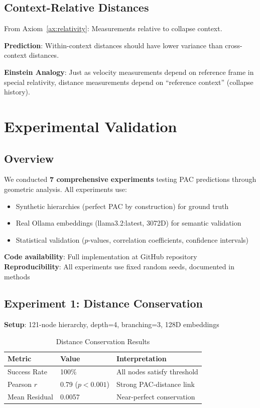 \documentclass[11pt,a4paper]{article}
\begin{document}
\subsection{Context-Relative Distances}

From Axiom~\ref{ax:relativity}: Measurements relative to collapse context.

\textbf{Prediction}: Within-context distances should have lower variance than cross-context distances.

\textbf{Einstein Analogy}: Just as velocity measurements depend on reference frame in special relativity, distance measurements depend on ``reference context'' (collapse history).

\section{Experimental Validation}

\subsection{Overview}

We conducted \textbf{7 comprehensive experiments} testing PAC predictions through geometric analysis. All experiments use:
\begin{itemize}
    \item Synthetic hierarchies (perfect PAC by construction) for ground truth
    \item Real Ollama embeddings (llama3.2:latest, 3072D) for semantic validation
    \item Statistical validation ($p$-values, correlation coefficients, confidence intervals)
\end{itemize}

\textbf{Code availability}: Full implementation at GitHub repository\\
\textbf{Reproducibility}: All experiments use fixed random seeds, documented in methods

\subsection{Experiment 1: Distance Conservation}

\textbf{Setup}: 121-node hierarchy, depth=4, branching=3, 128D embeddings

\begin{table}[h]
\centering
\begin{tabular}{lll}
\toprule
\textbf{Metric} & \textbf{Value} & \textbf{Interpretation} \\
\midrule
Success Rate & 100\% & All nodes satisfy threshold \\
Pearson $r$ & 0.79 ($p<0.001$) & Strong PAC-distance link \\
Mean Residual & 0.0057 & Near-perfect conservation \\
\bottomrule
\end{tabular}
\caption{Distance Conservation Results}
\end{table}
\end{document}
